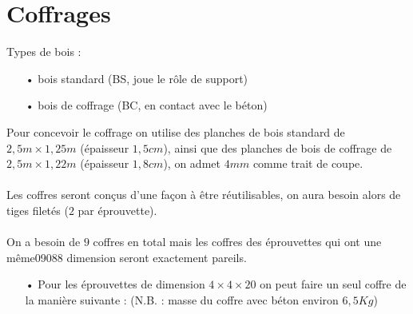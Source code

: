 \documentclass[12pt]{report}
\begin{document}


\section{Coffrages}
Types de bois :\\
\begin{itemize}
\item[•] bois standard (BS, joue le rôle de support)
\item[•] bois de coffrage (BC, en contact avec le béton)\\
\end{itemize}
Pour concevoir le coffrage on utilise des planches de bois standard de $2,5m \times{} 1,25m$
(épaisseur $1,5 cm$), ainsi que des planches de bois de coffrage de $2,5m \times{} 1,22m$ (épaisseur $1,8 cm$), on admet $4 mm$ comme trait de coupe.
\\\\
Les coffres seront conçus d’une façon à être réutilisables, on aura besoin alors de tiges
filetés ($2$ par éprouvette).
\\\\
On a besoin de $9$ coffres en total mais les coffres des éprouvettes qui ont une même09088
dimension seront exactement pareils.
\\
\begin{itemize}
\item[•] Pour les éprouvettes de dimension $4\times 4\times 20$ on peut faire un seul coffre de la manière
suivante : (N.B. : masse du coffre avec béton environ $6,5Kg$)
\end{itemize}
\end{document}
